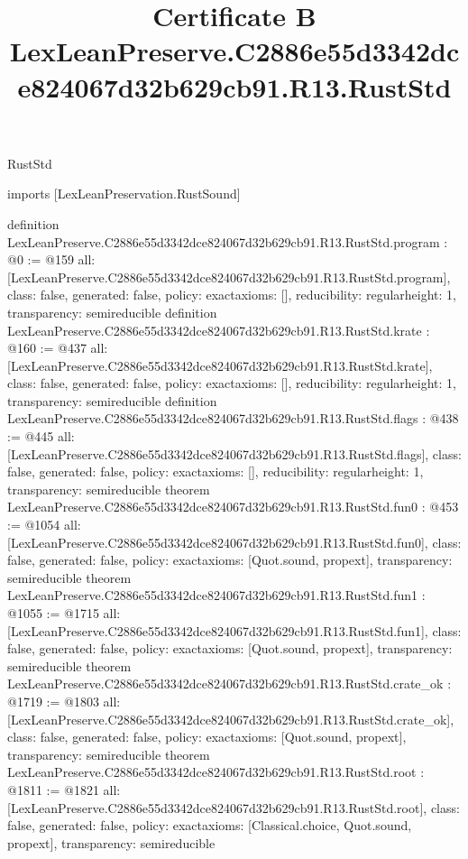 \begin{lexlean}{RustStd}
\title{Certificate B LexLeanPreserve.C2886e55d3342dce824067d32b629cb91.R13.RustStd}
\begin{coremodule}
imports [LexLeanPreservation.RustSound]

definition LexLeanPreserve.C2886e55d3342dce824067d32b629cb91.R13.RustStd.program : @0 := @159 {
  all: [LexLeanPreserve.C2886e55d3342dce824067d32b629cb91.R13.RustStd.program],
  class: false,
  generated: false,
  policy: exact{axioms: []},
  reducibility: regular{height: 1},
  transparency: semireducible
}
definition LexLeanPreserve.C2886e55d3342dce824067d32b629cb91.R13.RustStd.krate : @160 := @437 {
  all: [LexLeanPreserve.C2886e55d3342dce824067d32b629cb91.R13.RustStd.krate],
  class: false,
  generated: false,
  policy: exact{axioms: []},
  reducibility: regular{height: 1},
  transparency: semireducible
}
definition LexLeanPreserve.C2886e55d3342dce824067d32b629cb91.R13.RustStd.flags : @438 := @445 {
  all: [LexLeanPreserve.C2886e55d3342dce824067d32b629cb91.R13.RustStd.flags],
  class: false,
  generated: false,
  policy: exact{axioms: []},
  reducibility: regular{height: 1},
  transparency: semireducible
}
theorem LexLeanPreserve.C2886e55d3342dce824067d32b629cb91.R13.RustStd.fun0 : @453 := @1054 {
  all: [LexLeanPreserve.C2886e55d3342dce824067d32b629cb91.R13.RustStd.fun0],
  class: false,
  generated: false,
  policy: exact{axioms: [Quot.sound, propext]},
  transparency: semireducible
}
theorem LexLeanPreserve.C2886e55d3342dce824067d32b629cb91.R13.RustStd.fun1 : @1055 := @1715 {
  all: [LexLeanPreserve.C2886e55d3342dce824067d32b629cb91.R13.RustStd.fun1],
  class: false,
  generated: false,
  policy: exact{axioms: [Quot.sound, propext]},
  transparency: semireducible
}
theorem LexLeanPreserve.C2886e55d3342dce824067d32b629cb91.R13.RustStd.crate_ok : @1719 := @1803 {
  all: [LexLeanPreserve.C2886e55d3342dce824067d32b629cb91.R13.RustStd.crate_ok],
  class: false,
  generated: false,
  policy: exact{axioms: [Quot.sound, propext]},
  transparency: semireducible
}
theorem LexLeanPreserve.C2886e55d3342dce824067d32b629cb91.R13.RustStd.root : @1811 := @1821 {
  all: [LexLeanPreserve.C2886e55d3342dce824067d32b629cb91.R13.RustStd.root],
  class: false,
  generated: false,
  policy: exact{axioms: [Classical.choice, Quot.sound, propext]},
  transparency: semireducible
}


\end{coremodule}
\end{lexlean}
